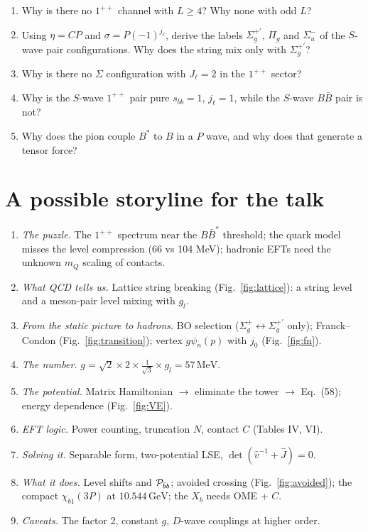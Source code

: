 \documentclass[11pt,a4paper]{article}
\newcommand{\BBst}{B\bar B^*}
\newcommand{\Pbb}{{\cal P}_{\bar bb}}
\renewcommand{\GeV}{\,\mathrm{GeV}}
\renewcommand{\MeV}{\,\mathrm{MeV}}
\begin{document}
\begin{enumerate}
\item Why is there no $1^{++}$ channel with $L\ge4$? Why none with odd $L$?
\item Using $\eta=CP$ and $\sigma=P(-1)^{j_\ell}$, derive the labels $\Sigma_g^{+\prime}$, $\Pi_g$ and $\Sigma_u^-$ of the $S$-wave pair configurations. Why does the string mix only with $\Sigma_g^{+\prime}$?
\item Why is there no $\Sigma$ configuration with $J_\ell=2$ in the $1^{++}$ sector?
\item Why is the $S$-wave $1^{++}$ pair pure $s_{\bar bb}=1$, $j_\ell=1$, while the $S$-wave $B\bar B$ pair is not?
\item Why does the pion couple $B^*$ to $B$ in a $P$ wave, and why does that generate a tensor force?
\end{enumerate}

\section{A possible storyline for the talk}

\begin{enumerate}
\item \emph{The puzzle.} The $1^{++}$ spectrum near the $\BBst$ threshold; the quark model misses the level compression (66 vs 104 MeV); hadronic EFTs need the unknown $m_Q$ scaling of contacts.
\item \emph{What QCD tells us.} Lattice string breaking (Fig.~\ref{fig:lattice}): a string level and a meson-pair level mixing with $g_l$.
\item \emph{From the static picture to hadrons.} BO selection ($\Sigma_g^+\leftrightarrow\Sigma_g^{+\prime}$ only); Franck--Condon (Fig.~\ref{fig:transition}); vertex $g\psi_n(p)$ with $j_0$ (Fig.~\ref{fig:fn}).
\item \emph{The number.} $g=\sqrt2\times2\times\frac1{\sqrt3}\times g_l=57\MeV$.
\item \emph{The potential.} Matrix Hamiltonian $\to$ eliminate the tower $\to$ Eq.~(58); energy dependence (Fig.~\ref{fig:VE}).
\item \emph{EFT logic.} Power counting, truncation $N$, contact $C$ (Tables IV, VI).
\item \emph{Solving it.} Separable form, two-potential LSE, $\det(\hat v^{-1}+\hat J)=0$.
\item \emph{What it does.} Level shifts and $\Pbb$; avoided crossing (Fig.~\ref{fig:avoided}); the compact $\chi_{b1}(3P)$ at $10.544\GeV$; the $X_b$ needs OME + $C$.
\item \emph{Caveats.} The factor 2, constant $g$, $D$-wave couplings at higher order.
\end{enumerate}
\end{document}
